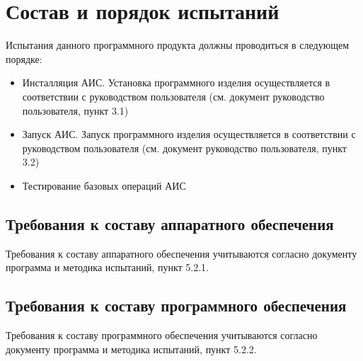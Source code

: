 \documentclass[russian,utf8,emptystyle]{eskdtext}
\begin{document}
\section{Состав и порядок испытаний}
Испытания данного программного продукта должны проводиться в следующем порядке:
\begin{itemize}
\item Инсталляция АИС. Установка программного изделия осуществляется в соответствии с руководством пользователя (см. документ руководство пользователя, пункт 3.1)
\item Запуск АИС. Запуск программного изделия осуществляется в соответствии с руководством пользователя (см. документ руководство пользователя, пункт 3.2)
\item Тестирование базовых операций АИС
\end{itemize}

\subsection{Требования к составу аппаратного обеспечения}
Требования к составу аппаратного обеспечения учитываются согласно документу программа и методика испытаний, пункт 5.2.1.

\subsection{Требования к составу программного обеспечения}
Требования к составу программного обеспечения учитываются согласно документу программа и методика испытаний, пункт 5.2.2.

\newpage
\end{document}
